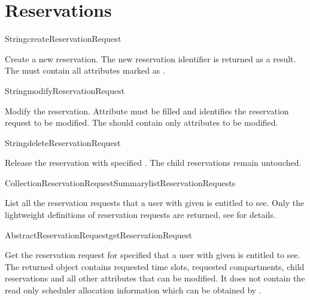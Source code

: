 \section{Reservations}

\begin{Api}

\begin{ApiCmd}{String}{createReservationRequest}%
%
%
\end{ApiCmd}
Create a new reservation. The new reservation identifier is returned as a result. The  must contain all attributes marked as \ApiRequired.

\begin{ApiCmd}{String}{modifyReservationRequest}%
%
%
\end{ApiCmd}
Modify the reservation. Attribute  must be filled and identifies the reservation request to be modified. The  should contain only attributes to be modified.

\begin{ApiCmd}{String}{deleteReservationRequest}%
%
%
\end{ApiCmd}
Release the reservation with specified . The child reservations remain untouched.

\begin{ApiCmdCollection}{Collection}{ReservationRequestSummary}{listReservationRequests}%
%
\end{ApiCmdCollection}
List all the reservation requests that a user with given  is entitled to see. Only the lightweight definitions of reservation requests are returned, see  for details.

\begin{ApiCmd}{AbstractReservationRequest}{getReservationRequest}%
%
%
\end{ApiCmd}
Get the reservation request for specified  that a user with given  is entitled to see. The returned object contains requested time slots, requested compartments, child reservations and all other attributes that can be modified. It does not contain the read only scheduler allocation information which can be obtained by .


\end{Api}
